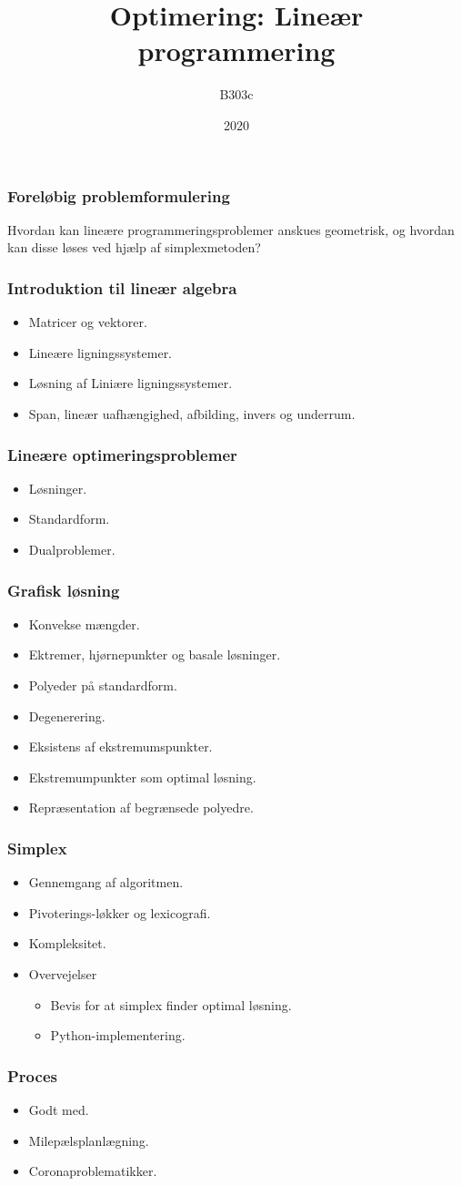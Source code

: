 \documentclass{beamer}
\title{Optimering: Lineær programmering}
\author{B303c}
\institute{Aalborg Universitet}
\date{2020}
\begin{document}
\frame{\titlepage}


\begin{frame}
\frametitle{Foreløbig problemformulering}
Hvordan kan lineære programmeringsproblemer anskues geometrisk, og hvordan kan disse løses ved hjælp af simplexmetoden?
\end{frame}
\begin{frame}
\frametitle{Introduktion til lineær algebra}
\begin{itemize}
\item Matricer og vektorer.
\item Lineære ligningssystemer.
\item Løsning af Liniære ligningssystemer.
\item Span, lineær uafhængighed, afbilding, invers og underrum.
\end{itemize}
\end{frame}


\begin{frame}
\frametitle{Lineære optimeringsproblemer}
\begin{itemize}
\item Løsninger.
\item Standardform.
\item Dualproblemer.
\end{itemize}
\end{frame}


\begin{frame}
\frametitle{Grafisk løsning}
\begin{itemize}
\item Konvekse mængder.
\item Ektremer, hjørnepunkter og basale løsninger.
\item Polyeder på standardform.
\item Degenerering.
\item Eksistens af ekstremumspunkter. %
\item Ekstremumpunkter som optimal løsning.
\item Repræsentation af begrænsede polyedre.
\end{itemize}
\end{frame}

\begin{frame}
\frametitle{Simplex}
\begin{itemize}
\item Gennemgang af algoritmen.
\item Pivoterings-løkker og lexicografi.
\item Kompleksitet.
\item Overvejelser
\begin{itemize}
\item Bevis for at simplex finder optimal løsning.
\item Python-implementering.
\end{itemize}
\end{itemize}
\end{frame}


\begin{frame}
\frametitle{Proces}
\begin{itemize}
\item Godt med.
\item Milepælsplanlægning.
\item Coronaproblematikker.
\end{itemize}
\end{frame}
\end{document}
